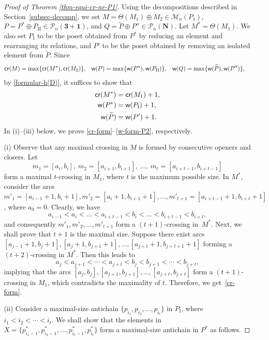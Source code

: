 \documentclass[11pt]{article}
\DeclareMathOperator{\crr}{\mbox{\sf{cr}}}
\DeclareMathOperator{\wid}{\mbox{\sf{w}}}
\newcommand{\PP}{{\mathcal P}}
\newcommand{\M}{\mathcal{M}}
\begin{document}
	\begin{proof}[Proof of Theorem \ref{thm-equi-cr-nr-P1}]
		Using the decompositions described in Section~\ref{subsec-decomp},
		we set $M=\Theta(M_1)\oplus M_2\in\M_n(P_1)$,
		$P=P^*\oplus P_{\text{II}}\in\PP_n(\mathbf{3+1})$, and  
		$Q=\widetilde{P}\oplus P''\in\PP_n(\mathbf{N})$.
		Let $M^*=\Theta(M_1)$.  
		We also set $P_{\text{I}}$ to be the poset obtained from $P^*$ by reducing an element and rearranging its relations, and $P'$ to be the poset obtained by removing an isolated element from $\widetilde{P}$.
		Since
		\begin{align*}
			\crr(M) &= \max\{\crr(M^*), \crr(M_2)\}, & 
			\wid(P) &= \max\{\wid(P^*), \wid(P_{\text{II}})\}, & 
			\wid(Q) &= \max\{\wid(\widetilde{P}), \wid(P'')\},
		\end{align*}
		by \eqref{formular-h(D)}, it suffices to show that
		\begin{align}
			\crr(M^*) &= \crr(M_1) + 1, \label{cr-form} \\
			\wid(P^*) &= \wid(P_{\text{I}}) + 1, \label{formular-w(P_1)} \\
			\wid(\widetilde{P}) &= \wid(P') + 1.  \label{w-form-P2}
		\end{align}
		In (i)--(iii) below, we prove \eqref{cr-form}--\eqref{w-form-P2}, respectively.
		
		\noindent
		(i) Observe that any maximal crossing in $M$ is formed by consecutive openers and closers. Let 
		\[
		m_1 = [a_{i}, b_{i}],\ m_2 = [a_{i+1}, b_{i+1}],\ \ldots,\ m_{t} = [a_{i+t-1}, b_{i+t-1}]
		\]
		form a maximal \( t \)-crossing in $M_1$, where $t$ is the maximum possible size.
		In $M^*$, consider the arcs $m'_1=[a_{i-1}+1, b_{i}+1], m'_2=[a_{i}+1, b_{i+1}+1], \ldots, m'_{t+1}=[a_{i+t-1}+1,b_{i+t}+1]$, where $a_0=0$.
		Clearly, we have
		\[
		a_{i-1} < a_{i} < \dots < a_{i+t-1} < b_{i} < \dots < b_{i+t-1} < b_{i+t},
		\]
		and consequently $m'_1,m'_2,\dots,m'_{t+1}$ form a $(t+1)$-crossing in~$M^*$. Next, we shall prove that $t+1$ is the maximal size. 
		Suppose there exist arcs $[a_{j-1}+1, b_j+1], [a_j+1, b_{j+1}+1], \ldots, [a_{j+t}+1, b_{j+t+1}+1]$ forming a $(t+2)$-crossing in $M^*$. Then this leads to
		\[
		a_j < a_{j+1} < \cdots < a_{j+t} < b_j < b_{j+1} < \cdots < b_{j+t},
		\]
		implying that the arcs $[a_j, b_j], [a_{j+1}, b_{j+1}], \ldots, [a_{j+t}, b_{j+t}]$ form a $(t+1)$-crossing in $M_1$, which contradicts the maximality of $t$.
		Therefore, we get~\eqref{cr-form}.
		
		\noindent
		(ii) Consider a maximal-size antichain \( \{p_{i_1}, p_{i_2}, \ldots, p_{i_t}\} \) in \( P_{\text{I}} \), where \( i_1 < i_2 < \cdots < i_t \). We shall show that the elements in \( X = \{p^*_{i_1 - 1}, p^*_{i_2 - 1}, \ldots, p^*_{i_t-1}, p^*_{i_t}\} \) form a maximal-size antichain in \( P^* \) as follows.  
		

\end{proof}
\end{document}
